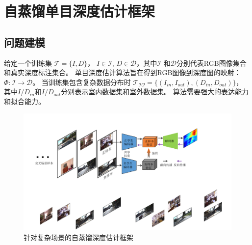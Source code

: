 \section{自蒸馏单目深度估计框架}
\subsection{问题建模}
给定一个训练集 $\mathcal{T} = \{I,D\}$，
$I\in \mathcal{I}$, $D\in \mathcal{D}$，其中$\mathcal{I}$ 
和$\mathcal{D}$分别代表RGB图像集合和真实深度标注集合。
单目深度估计算法旨在得到RGB图像到深度图的映射：
$\varPhi:\mathcal{I}\rightarrow \mathcal{D}$。
当训练集包含复杂数据分布时
$\mathcal{T_{IO}} = \{(I_{in},I_{out}), (D_{in},D_{out})\}$，
其中$I/D_{in}$和$I/D_{out}$分别表示室内数据集和室外数据集。
算法需要强大的表达能力和拟合能力。

\begin{figure}[t]
    \centering
  \includegraphics[width=1\linewidth]{figure/Stream.pdf}
  \centering
       \caption{针对复杂场景的自蒸馏深度估计框架}
   \label{Stream of algorithm} 
  \end{figure}
